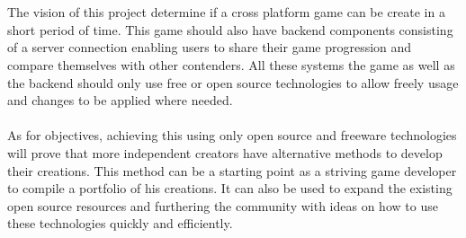 \documentclass[letterpaper]{article}
\begin{document}
		\vspace{0.2in}
		
		\section*{\colorbox{blue}{}} 
		
		\vspace{0.2in}
		
		The vision of this project determine if a cross platform game can be create in a short period of time. This game should also have backend components consisting of a server connection enabling users to share their game progression and compare themselves with other contenders. All these systems the game as well as the backend should only use free or open source technologies to allow freely usage and changes to be applied where needed.
		\\
		\\
		As for objectives, achieving this using only open source and freeware technologies will prove that more independent creators have alternative methods to develop their creations. This method can be a starting point as a striving game developer to compile a portfolio of his creations. It can also be used to expand the existing open source resources and furthering the community with ideas on how to use these technologies quickly and efficiently.
		
		\vspace{0.2in}
				
		\section*{\colorbox{blue}{}} 
		
		\vspace{0.2in}
		
\end{document}
